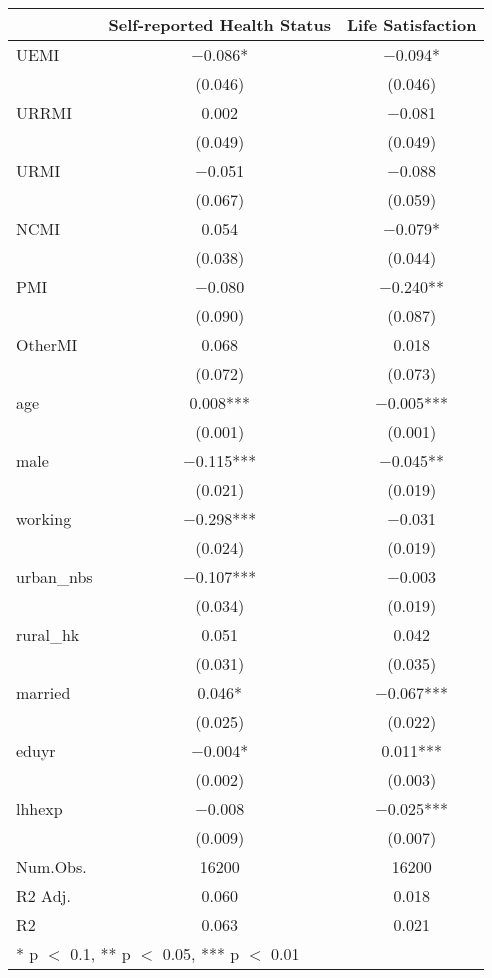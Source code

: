 \begin{table}
\centering
\begin{tabular}[t]{lcc}
\toprule
  & Self-reported Health Status & Life Satisfaction\\
\midrule
UEMI & \num{-0.086}* & \num{-0.094}*\\
 & (\num{0.046}) & (\num{0.046})\\
URRMI & \num{0.002} & \num{-0.081}\\
 & (\num{0.049}) & (\num{0.049})\\
URMI & \num{-0.051} & \num{-0.088}\\
 & (\num{0.067}) & (\num{0.059})\\
NCMI & \num{0.054} & \num{-0.079}*\\
 & (\num{0.038}) & (\num{0.044})\\
PMI & \num{-0.080} & \num{-0.240}**\\
 & (\num{0.090}) & (\num{0.087})\\
OtherMI & \num{0.068} & \num{0.018}\\
 & (\num{0.072}) & (\num{0.073})\\
age & \num{0.008}*** & \num{-0.005}***\\
 & (\num{0.001}) & (\num{0.001})\\
male & \num{-0.115}*** & \num{-0.045}**\\
 & (\num{0.021}) & (\num{0.019})\\
working & \num{-0.298}*** & \num{-0.031}\\
 & (\num{0.024}) & (\num{0.019})\\
urban\_nbs & \num{-0.107}*** & \num{-0.003}\\
 & (\num{0.034}) & (\num{0.019})\\
rural\_hk & \num{0.051} & \num{0.042}\\
 & (\num{0.031}) & (\num{0.035})\\
married & \num{0.046}* & \num{-0.067}***\\
 & (\num{0.025}) & (\num{0.022})\\
eduyr & \num{-0.004}* & \num{0.011}***\\
 & (\num{0.002}) & (\num{0.003})\\
lhhexp & \num{-0.008} & \num{-0.025}***\\
 & (\num{0.009}) & (\num{0.007})\\
\midrule
Num.Obs. & \num{16200} & \num{16200}\\
R2 Adj. & \num{0.060} & \num{0.018}\\
R2 & \num{0.063} & \num{0.021}\\
\bottomrule
\multicolumn{3}{l}{\rule{0pt}{1em}* p $<$ 0.1, ** p $<$ 0.05, *** p $<$ 0.01}\\
\end{tabular}
\end{table}

